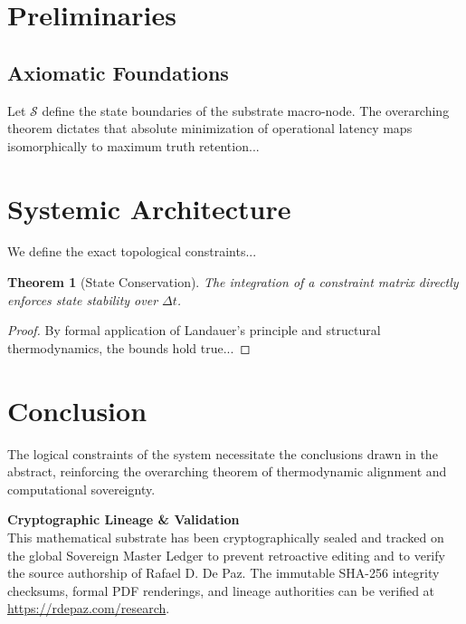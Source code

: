 \documentclass[12pt, a4paper]{article}
\theoremstyle{plain}
\newtheorem{theorem}{Theorem}[section]
\theoremstyle{definition}
\theoremstyle{remark}
\begin{document}
\section{Preliminaries}\label{sec:prelim}
\subsection{Axiomatic Foundations}
Let $\mathcal{S}$ define the state boundaries of the substrate macro-node. The overarching theorem dictates that absolute minimization of operational latency maps isomorphically to maximum truth retention...

\section{Systemic Architecture}\label{sec:architecture}
We define the exact topological constraints...
\begin{theorem}[State Conservation]\label{thm:conservation}
The integration of a constraint matrix directly enforces state stability over $\Delta t$.
\end{theorem}
\begin{proof}
By formal application of Landauer's principle and structural thermodynamics, the bounds hold true...
\end{proof}

\section{Conclusion}\label{sec:conclusion}
The logical constraints of the system necessitate the conclusions drawn in the abstract, reinforcing the overarching theorem of thermodynamic alignment and computational sovereignty.


\vspace{2em}
\noindent\hrulefill
\vspace{1em}

\noindent\textbf{Cryptographic Lineage \& Validation}\\
This mathematical substrate has been cryptographically sealed and tracked on the global Sovereign Master Ledger to prevent retroactive editing and to verify the source authorship of Rafael D. De Paz. The immutable SHA-256 integrity checksums, formal PDF renderings, and lineage authorities can be verified at \url{https://rdepaz.com/research}.



\end{document}
